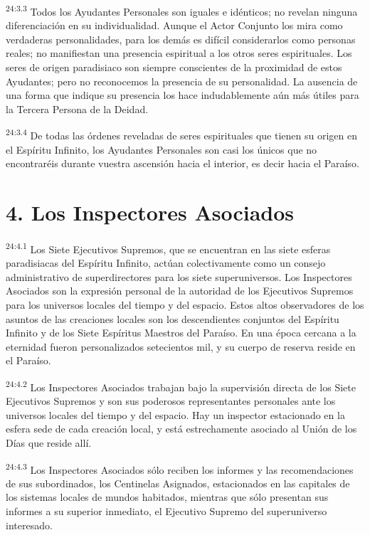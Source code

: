 \par
\textsuperscript{24:3.3} Todos los Ayudantes Personales son iguales e idénticos; no revelan ninguna diferenciación en su individualidad. Aunque el Actor Conjunto los mira como verdaderas personalidades, para los demás es difícil considerarlos como personas reales; no manifiestan una presencia espiritual a los otros seres espirituales. Los seres de origen paradisiaco son siempre conscientes de la proximidad de estos Ayudantes; pero no reconocemos la presencia de su personalidad. La ausencia de una forma que indique su presencia los hace indudablemente aún más útiles para la Tercera Persona de la Deidad.

\par
\textsuperscript{24:3.4} De todas las órdenes reveladas de seres espirituales que tienen su origen en el Espíritu Infinito, los Ayudantes Personales son casi los únicos que no encontraréis durante vuestra ascensión hacia el interior, es decir hacia el Paraíso.

\section*{4. Los Inspectores Asociados}
\par
\textsuperscript{24:4.1} Los Siete Ejecutivos Supremos, que se encuentran en las siete esferas paradisiacas del Espíritu Infinito, actúan colectivamente como un consejo administrativo de superdirectores para los siete superuniversos. Los Inspectores Asociados son la expresión personal de la autoridad de los Ejecutivos Supremos para los universos locales del tiempo y del espacio. Estos altos observadores de los asuntos de las creaciones locales son los descendientes conjuntos del Espíritu Infinito y de los Siete Espíritus Maestros del Paraíso. En una época cercana a la eternidad fueron personalizados setecientos mil, y su cuerpo de reserva reside en el Paraíso.

\par
\textsuperscript{24:4.2} Los Inspectores Asociados trabajan bajo la supervisión directa de los Siete Ejecutivos Supremos y son sus poderosos representantes personales ante los universos locales del tiempo y del espacio. Hay un inspector estacionado en la esfera sede de cada creación local, y está estrechamente asociado al Unión de los Días que reside allí.

\par
\textsuperscript{24:4.3} Los Inspectores Asociados sólo reciben los informes y las recomendaciones de sus subordinados, los Centinelas Asignados, estacionados en las capitales de los sistemas locales de mundos habitados, mientras que sólo presentan sus informes a su superior inmediato, el Ejecutivo Supremo del superuniverso interesado.

